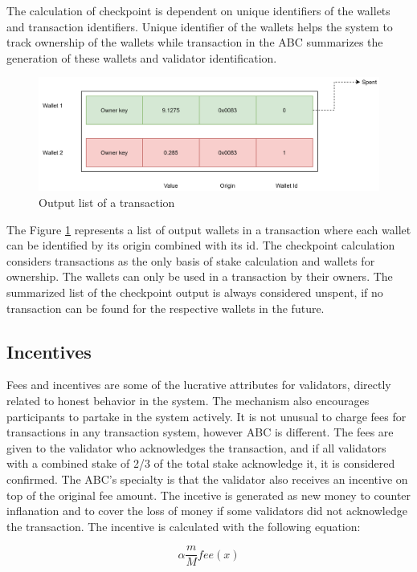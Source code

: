 {The calculation of checkpoint is dependent on unique identifiers of the wallets and transaction identifiers. Unique identifier of the wallets helps the system to track ownership of the wallets while transaction in the ABC summarizes the generation of these wallets and validator identification. 
\begin{figure}
    \centering
    \includegraphics[width=125mm,scale=0.5]{figures/drawio/wallet_demo (1).png}
    \caption{Output list of a transaction}
    \label{fig:ckpt_wallet}
\end{figure}
The Figure \ref{fig:ckpt_wallet} represents a list of output wallets in a transaction where each wallet can be identified by its origin combined with its id. The checkpoint calculation considers transactions as the only basis of stake calculation and wallets for ownership. The wallets can only be used in a transaction by their owners. The summarized list of the checkpoint output is always considered unspent, if no transaction can be found for the respective wallets in the future. 
\subsection{Incentives}\label{incentive}
Fees and incentives are some of the lucrative attributes for validators, directly related to honest behavior in the system. The mechanism also encourages participants to partake in the system actively. It is not unusual to charge fees for transactions in any transaction system, however ABC is different. The fees are given to the validator who acknowledges the transaction, and if all validators with a combined stake of  2/3 of the total stake acknowledge it, it is considered confirmed. The ABC's specialty is that the validator also receives an incentive on top of the original fee amount. The incetive is generated as new money to counter inflanation and to cover the loss of money if some validators did not acknowledge the transaction.
The incentive is calculated with the following equation:

\begin{equation}
\alpha\dfrac{m}{M}fee(x)
\end{equation}

}
